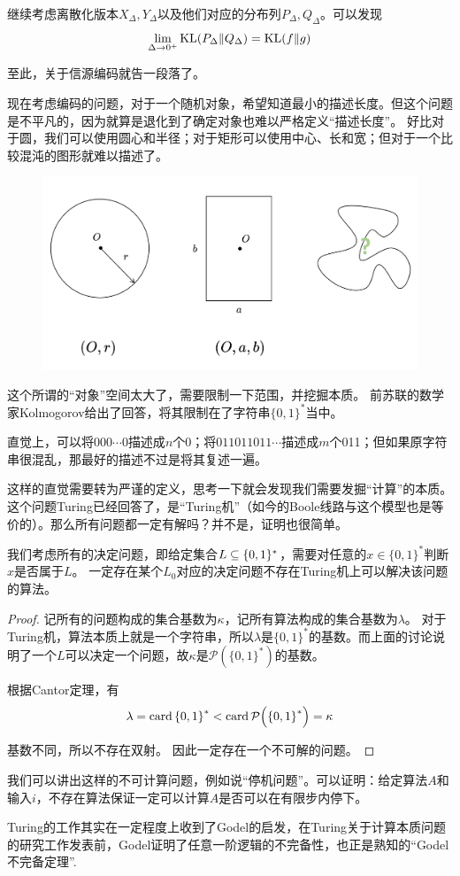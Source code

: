 继续考虑离散化版本$X_\Delta, Y_\Delta$以及他们对应的分布列$P_\Delta, Q_\Delta$。可以发现 
\[
\lim_{\Delta \rightarrow 0^+} \text{KL}(P_\Delta \| Q_\Delta) = \text{KL}(f\| g)
\]

至此，关于信源编码就告一段落了。

现在考虑编码的问题，对于一个随机对象，希望知道最小的描述长度。但这个问题是不平凡的，因为就算是退化到了确定对象也难以严格定义“描述长度”。 好比对于圆，我们可以使用圆心和半径；对于矩形可以使用中心、长和宽；但对于一个比较混沌的图形就难以描述了。

\begin{figure}[H]
    \centering
    \includegraphics[width=.75\textwidth]{images/c6_1.png}
\end{figure}

这个所谓的“对象”空间太大了，需要限制一下范围，并挖掘本质。 前苏联的数学家Kolmogorov给出了回答，将其限制在了字符串$\{0,1\}^*$当中。

\begin{example}
    直觉上，可以将$000\cdots 0$描述成$n$个0；将$011011011\cdots$描述成$m$个011；但如果原字符串很混乱，那最好的描述不过是将其复述一遍。
\end{example}

这样的直觉需要转为严谨的定义，思考一下就会发现我们需要发掘“计算”的本质。这个问题Turing已经回答了，是“Turing机”（如今的Boole线路与这个模型也是等价的）。那么所有问题都一定有解吗？并不是，证明也很简单。 

\begin{theorem}
    我们考虑所有的决定问题，即给定集合$L \subseteq \{0, 1\}^*$，需要对任意的$x\in \{0,1\}^*$判断$x$是否属于$L$。 一定存在某个$L_0$对应的决定问题不存在Turing机上可以解决该问题的算法。
\end{theorem}
\begin{proof}
    记所有的问题构成的集合基数为$\kappa$，记所有算法构成的集合基数为$\lambda$。 对于Turing机，算法本质上就是一个字符串，所以$\lambda$是$\{0, 1\}^*$的基数。而上面的讨论说明了一个$L$可以决定一个问题，故$\kappa$是$\mathcal{P}(\{0, 1\}^*)$的基数。 

    根据Cantor定理，有 
    \[
    \lambda = \operatorname*{card} {\{0, 1\}}^* < \operatorname*{card} \mathcal{P} \Big( {\{0, 1\}}^* \Big) = \kappa
    \]

    基数不同，所以不存在双射。 因此一定存在一个不可解的问题。
\end{proof}

我们可以讲出这样的不可计算问题，例如说“停机问题”。可以证明：给定算法$A$和输入$i$，不存在算法保证一定可以计算$A$是否可以在有限步内停下。 

Turing的工作其实在一定程度上收到了Godel的启发，在Turing关于计算本质问题的研究工作发表前，Godel证明了任意一阶逻辑的不完备性，也正是熟知的“Godel不完备定理”.